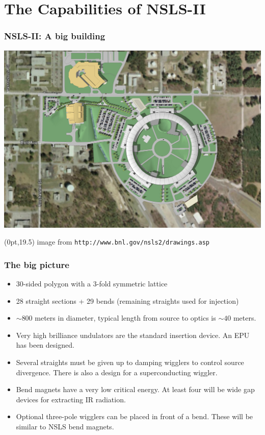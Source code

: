 \documentclass[10pt, xcolor=x11names, compress]{beamer}
\begin{document}
\section[NSLS-II Overview]{The Capabilities of NSLS-II}

\begin{frame}
  \frametitle{NSLS-II: A big building}
  \includegraphics[width=\linewidth]{pses/NSLS2_planView_Jul07-big.jpg}
  \begin{textblock*}{0.5\linewidth}(0pt,19.5\TPVertModule) 
    \tiny
    image from \texttt{http://www.bnl.gov/nsls2/drawings.asp}
  \end{textblock*}
\end{frame}

\begin{frame}
  \frametitle{The big picture}
  \begin{itemize}
  \item 30-sided polygon with a 3-fold symmetric lattice
  \item 28 straight sections + 29 bends (remaining straights used for injection)
  \item $\sim800$ meters in diameter, typical length from source to
    optics is $\sim40$ meters.
  \item Very high brilliance undulators are the standard insertion
    device.  An EPU has been designed.
  \item Several straights must be given up to \alert{damping wigglers}
    to control source divergence.  There is also a design for a
    superconducting wiggler.
  \item Bend magnets have a very low critical energy.  At least four
    will be wide gap devices for extracting IR radiation.
  \item Optional three-pole wigglers can be placed in front of a
    bend.  These will be similar to NSLS bend magnets.
  \end{itemize}
\end{frame}
\end{document}
